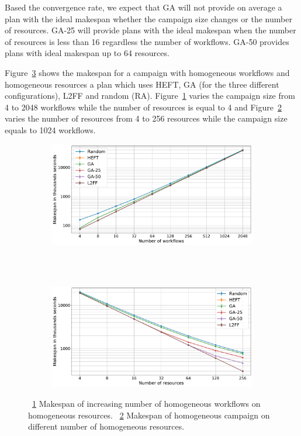 Based the convergence rate, we expect that GA will not provide on average a plan with the ideal makespan whether the campaign size changes or the number of resources.
GA-25 will provide plans with the ideal makespan when the number of resources is less than 16 regardless the number of workflows.
GA-50 provides plans with ideal makespan up to 64 resources.

Figure~\ref{fig:st_homog_analysis} shows the makespan for a campaign with homogeneous workflows and homogeneous resources a plan which uses HEFT, GA (for the three different configurations), L2FF and random (RA).
Figure~\ref{fig:StHomoCampaigns_4StHomoResources} varies the campaign size from 4 to 2048 workflows while the number of resources is equal to 4 and Figure~\ref{fig:StHomoResources_StHomoCampaigns} varies the number of resources from 4 to 256 resources while the campaign size equals to 1024 workflows.

\begin{figure}[ht!]
    \centering
    \begin{subfigure}[b]{0.75\textwidth}
        \includegraphics[width=.95\textwidth]{figures/campaign/StHomoCampaigns_4StHomoResources.pdf}
        \caption{}
        \label{fig:StHomoCampaigns_4StHomoResources}
    \end{subfigure}\\
    ~ 
    \begin{subfigure}[b]{0.75\textwidth}
        \includegraphics[width=.95\textwidth]{figures/campaign/StHomoResources_StHomoCampaigns.pdf}
        \caption{}
        \label{fig:StHomoResources_StHomoCampaigns}
    \end{subfigure}
    \caption{~\ref{fig:StHomoCampaigns_4StHomoResources} Makespan of increasing number of homogeneous workflows on homogeneous resources.
    ~\ref{fig:StHomoResources_StHomoCampaigns} Makespan of homogeneous campaign on different number of homogeneous resources.}
    \label{fig:st_homog_analysis}
\end{figure}


